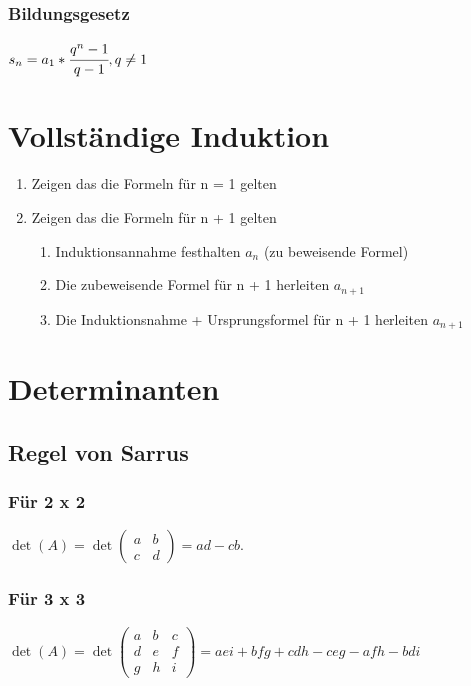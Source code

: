 \documentclass[a4paper,12pt]{scrartcl}
\begin{document}
\subsubsection{Bildungsgesetz}
$s_n = a_1 * \cfrac{q^n - 1}{q - 1}, q \ne 1$

\newpage
\section{Vollständige Induktion}
\begin{enumerate}
\item Zeigen das die Formeln für n = 1 gelten
\item Zeigen das die Formeln für n + 1 gelten
\begin{enumerate}
\item Induktionsannahme festhalten $a_n$ (zu beweisende Formel)
\item Die zubeweisende Formel für n + 1 herleiten $a_{n+1}$
\item Die Induktionsnahme + Ursprungsformel für n + 1 herleiten $a_{n+1}$
\end{enumerate}
\end{enumerate}

\newpage
\section{Determinanten}
\subsection{Regel von Sarrus}
\subsubsection{Für 2 x 2}

$
\det(A) = 
\det \begin{pmatrix}
a & b \\ 
c & d 
\end{pmatrix} = ad - cb.
$

\subsubsection{Für 3 x 3}
$ \det(A) = \det
\begin{pmatrix}
  a & b & c \\
  d & e & f \\
  g & h & i
\end{pmatrix} = aei + bfg + cdh - ceg -afh -bdi
$
\end{document}
